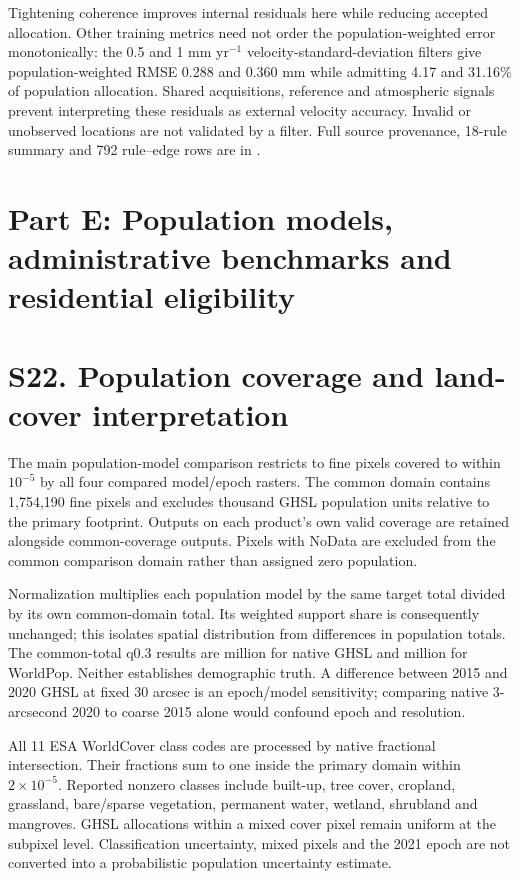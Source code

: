 \documentclass[10pt,a4paper]{article}
\begin{document}
Tightening coherence improves internal residuals here while reducing accepted allocation. Other training metrics need not order the population-weighted error monotonically: the 0.5 and 1 mm yr$^{-1}$ velocity-standard-deviation filters give population-weighted RMSE 0.288 and 0.360 mm while admitting 4.17 and 31.16\% of population allocation. Shared acquisitions, reference and atmospheric signals prevent interpreting these residuals as external velocity accuracy. Invalid or unobserved locations are not validated by a filter. Full source provenance, 18-rule summary and 792 rule--edge rows are in .




\section*{Part E: Population models, administrative benchmarks and residential eligibility}
\section*{S22. Population coverage and land-cover interpretation}
The main population-model comparison restricts to fine pixels covered to within $10^{-5}$ by all four compared model/epoch rasters. The common domain contains 1,754,190 fine pixels and excludes \JointExcluded{} thousand GHSL population units relative to the primary footprint. Outputs on each product's own valid coverage are retained alongside common-coverage outputs. Pixels with NoData are excluded from the common comparison domain rather than assigned zero population.

Normalization multiplies each population model by the same target total divided by its own common-domain total. Its weighted support share is consequently unchanged; this isolates spatial distribution from differences in population totals. The common-total q0.3 results are \GHSLJointCommon{} million for native GHSL and \WPJointCommon{} million for WorldPop. Neither establishes demographic truth. A difference between 2015 and 2020 GHSL at fixed 30 arcsec is an epoch/model sensitivity; comparing native 3-arcsecond 2020 to coarse 2015 alone would confound epoch and resolution.

All 11 ESA WorldCover class codes are processed by native fractional intersection. Their fractions sum to one inside the primary domain within $2\times10^{-5}$. Reported nonzero classes include built-up, tree cover, cropland, grassland, bare/sparse vegetation, permanent water, wetland, shrubland and mangroves. GHSL allocations within a mixed cover pixel remain uniform at the subpixel level. Classification uncertainty, mixed pixels and the 2021 epoch are not converted into a probabilistic population uncertainty estimate.
\end{document}
